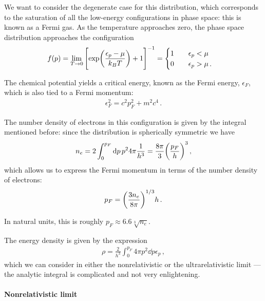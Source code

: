 \documentclass[main.tex]{subfiles}
\begin{document}
We want to consider the degenerate case for this distribution, which corresponds to the saturation of all the low-energy configurations in phase space: this is known as a Fermi gas. 
As the temperature approaches zero, the phase space distribution approaches the configuration 
%
\begin{align}
f(p) = \lim_{T \to 0} \qty[\exp(\frac{\epsilon_p - \mu }{k_B T})+1]^{-1}= 
\begin{cases}
  1 \qquad \epsilon _p < \mu  \\
  0 \qquad \epsilon _p > \mu 
\,.
\end{cases}
\end{align}

The chemical potential yields a critical energy, known as the Fermi energy, \(\epsilon _F\), which is also tied to a Fermi momentum:
%
%
\begin{align}
  \epsilon_F^2 = c^2p_F^2 + m^2 c^{4}
\,.
\end{align}

The number density of electrons in this configuration is given by the integral mentioned before: since the distribution is spherically symmetric we have
%
\begin{align}
  n_e = 2 \int_{0}^{p_F} \dd{p} p^2 4 \pi \frac{1}{h^3}
  = \frac{8 \pi }{3} \qty(\frac{p_F}{h})^{3}
\,,
\end{align}
%
which allows us to express the Fermi momentum in terms of the number density of electrons:
%
\begin{align}
  p_F = \qty(\frac{3n_e}{8 \pi })^{1/3} h
\,.
\end{align}

In natural units, this is roughly \(p_F \approx \num{6.6} \sqrt[3]{n_e}\).

The energy density is given by the expression
%
\begin{align}
  \rho = \frac{2}{h^3} \int_{0}^{p_F} 4 \pi p^2\dd{p} \epsilon _p
\,,
\end{align}
%
which we can consider in either the nonrelativistic or the ultrarelativistic limit --- the analytic integral is complicated and not very enlightening. 

\paragraph{Nonrelativistic limit}
\end{document}
